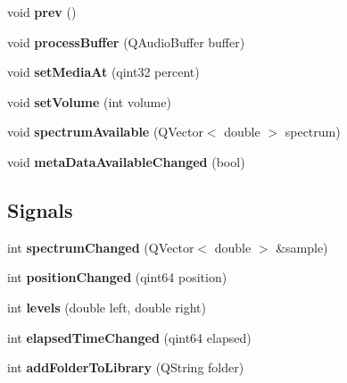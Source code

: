 \begin{DoxyCompactItemize}
\item 
\hypertarget{class_main_window_a56270e72e4ec5e058a040657932069cf}{void {\bfseries prev} ()}\label{class_main_window_a56270e72e4ec5e058a040657932069cf}

\item 
\hypertarget{class_main_window_a5c459d00d64786ef93db7670034af47d}{void {\bfseries process\-Buffer} (Q\-Audio\-Buffer buffer)}\label{class_main_window_a5c459d00d64786ef93db7670034af47d}

\item 
\hypertarget{class_main_window_aedb83314811efab4ea67c69cbce29aea}{void {\bfseries set\-Media\-At} (qint32 percent)}\label{class_main_window_aedb83314811efab4ea67c69cbce29aea}

\item 
\hypertarget{class_main_window_aeb9309a7fe8efd574fe5b7ac92ba2a92}{void {\bfseries set\-Volume} (int volume)}\label{class_main_window_aeb9309a7fe8efd574fe5b7ac92ba2a92}

\item 
\hypertarget{class_main_window_a9efd699e3eaed3396733475499297bc0}{void {\bfseries spectrum\-Available} (Q\-Vector$<$ double $>$ spectrum)}\label{class_main_window_a9efd699e3eaed3396733475499297bc0}

\item 
\hypertarget{class_main_window_ac7664400c470d7312a62ec8f4f7822a6}{void {\bfseries meta\-Data\-Available\-Changed} (bool)}\label{class_main_window_ac7664400c470d7312a62ec8f4f7822a6}

\end{DoxyCompactItemize}
\subsection*{Signals}
\begin{DoxyCompactItemize}
\item 
\hypertarget{class_main_window_a0db59b0091efb9ef939245562e84b79a}{int {\bfseries spectrum\-Changed} (Q\-Vector$<$ double $>$ \&sample)}\label{class_main_window_a0db59b0091efb9ef939245562e84b79a}

\item 
\hypertarget{class_main_window_a8df9e5e5d0997eb8e5ecdbcf42bb57ca}{int {\bfseries position\-Changed} (qint64 position)}\label{class_main_window_a8df9e5e5d0997eb8e5ecdbcf42bb57ca}

\item 
\hypertarget{class_main_window_a59803bb114724dc5f3717dc28539f164}{int {\bfseries levels} (double left, double right)}\label{class_main_window_a59803bb114724dc5f3717dc28539f164}

\item 
\hypertarget{class_main_window_ad255b6b8019a66a663a9c1de04d42a80}{int {\bfseries elapsed\-Time\-Changed} (qint64 elapsed)}\label{class_main_window_ad255b6b8019a66a663a9c1de04d42a80}

\item 
\hypertarget{class_main_window_a659d33ceffcceae28005205fe44edda4}{int {\bfseries add\-Folder\-To\-Library} (Q\-String folder)}\label{class_main_window_a659d33ceffcceae28005205fe44edda4}

\end{DoxyCompactItemize}
